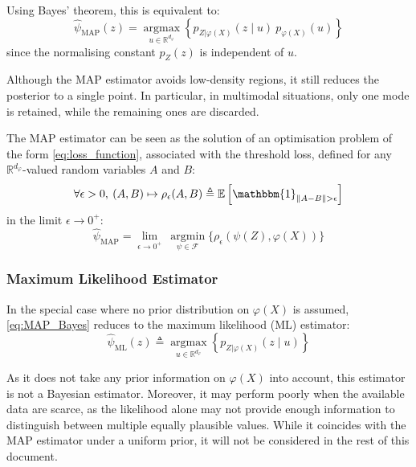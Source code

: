 Using Bayes' theorem, this is equivalent to:
\begin{equation}
	\hat{\psi}_{\mathrm{MAP}}(z)=\underset{u\in\mathbb{R}^{d_{\varphi}}}{\operatorname{argmax}}\left\{p_{Z|\varphi(X)}(z\mid u)\:p_{\varphi(X)}(u)\right\}\label{eq:MAP_Bayes}
\end{equation}
since the normalising constant $p_Z(z)$ is independent of $u$.

Although the MAP estimator avoids low-density regions, it still reduces the posterior to a single point. In particular, in multimodal situations, only one mode is retained, while the remaining ones are discarded.

\begin{remark}
	The MAP estimator can be seen as the solution of an optimisation problem of the form \eqref{eq:loss_function}, associated with the threshold loss, defined for any $\mathbb{R}^{d_{\varphi}}$-valued random variables $A$ and $B$:
	\begin{equation}
		\forall\epsilon>0,\:(A,B)\mapsto\rho_\epsilon(A,B)\triangleq\mathbb{E}\left[\mathbbm{1}_{\|A-B\|>\epsilon}\right]
	\end{equation}
	in the limit $\epsilon\to0^+$:
	\begin{equation}
		\hat{\psi}_{\mathrm{MAP}}=\lim_{\epsilon\to0^+}\ \underset{\psi\in\mathcal{F}}{\operatorname{argmin}}\{\rho_\epsilon(\psi(Z),\varphi(X))\}
	\end{equation}
\end{remark}

\subsubsection{Maximum Likelihood Estimator}

In the special case where no prior distribution on $\varphi(X)$ is assumed, \eqref{eq:MAP_Bayes} reduces to the maximum likelihood (ML) estimator:
\begin{equation}
	\hat{\psi}_{\mathrm{ML}}(z)\triangleq\underset{u\in\mathbb{R}^{d_{\varphi}}}{\operatorname{argmax}}\left\{p_{Z|\varphi(X)}(z\mid u)\right\}
\end{equation}

As it does not take any prior information on $\varphi(X)$ into account, this estimator is not a Bayesian estimator. Moreover, it may perform poorly when the available data are scarce, as the likelihood alone may not provide enough information to distinguish between multiple equally plausible values. While it coincides with the MAP estimator under a uniform prior, it will not be considered in the rest of this document.

